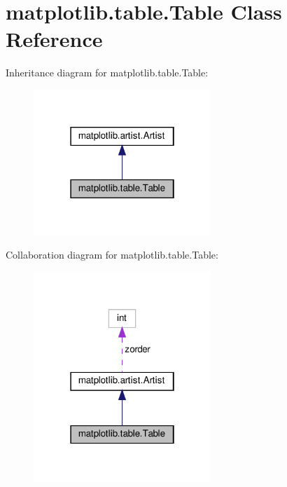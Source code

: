 \hypertarget{classmatplotlib_1_1table_1_1Table}{}\section{matplotlib.\+table.\+Table Class Reference}
\label{classmatplotlib_1_1table_1_1Table}


Inheritance diagram for matplotlib.\+table.\+Table\+:
\nopagebreak
\begin{figure}[H]
\begin{center}
\leavevmode
\includegraphics[width=190pt]{classmatplotlib_1_1table_1_1Table__inherit__graph}
\end{center}
\end{figure}


Collaboration diagram for matplotlib.\+table.\+Table\+:
\nopagebreak
\begin{figure}[H]
\begin{center}
\leavevmode
\includegraphics[width=190pt]{classmatplotlib_1_1table_1_1Table__coll__graph}
\end{center}
\end{figure}
